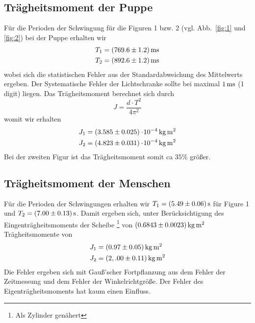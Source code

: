\subsection{Trägheitsmoment der Puppe}


Für die Perioden der Schwingung für die Figuren 1 bzw. 2 (vgl. Abb.~\ref{fig:1} und \ref{fig:2}) bei der Puppe erhalten wir 
%
\begin{align*}
    T_1 &= \unit[(769.6 \pm 1.2)]{ms} \\
    T_2 &= \unit[(892.6 \pm 1.2)]{ms}
\end{align*}
%
wobei sich die statistischen Fehler aus der Standardabweichung des Mittelwerts ergeben. Der Systematische Fehler der Lichtschranke sollte bei maximal $\unit[1]{ms}$ (1 digit) liegen. Das Trägheitsmoment berechnet sich durch
\[
    J = \frac{d \cdot T^2}{4 \pi^2} 
\]
womit wir erhalten
%
\begin{align*}
    J_1 &= \unit[(3.585 \pm 0.025) \e{-4}]{kg\,m^2} \\
    J_2 &= \unit[(4.823 \pm 0.031) \e{-4}]{kg\,m^2}
\end{align*}
%
Bei der zweiten Figur ist das Trägheitsmoment somit ca $35 \%$ größer.


\subsection{Trägheitsmoment der Menschen}

Für die Perioden der Schwingungen erhalten wir $T_1 = \unit[(5.49 \pm 0.06)]{s}$ für Figure 1 und $T_2 = \unit[(7.00 \pm 0.13)]{s}$. Damit ergeben sich, unter Berücksichtigung des Eingenträgheitsmoments der Scheibe%
\footnote{Als Zylinder genähert}
von $\unit[(0.6843 \pm 0.0023)]{kg\,m^2}$ Trägheitsmomente von 
%
\begin{align*}
    J_1 &= \unit[(0.97 \pm 0.05)]{kg\, m^2}\\
    J_2 &= \unit[(2,.00 \pm 0.11)]{kg\, m^2}
\end{align*}
%
Die Fehler ergeben sich mit Gauß'scher Fortpflanzung aus dem Fehler der Zeitmessung und dem Fehler der Winkelrichtgröße. Der Fehler des Eigenträgheitsmoments hat kaum einen Einfluss.

